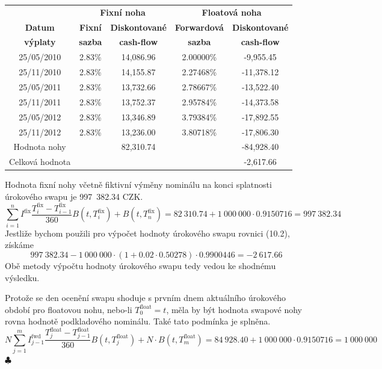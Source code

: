 \documentclass[a4paper]{book}
\begin{document}
\begin{center}
     \begin{tabular}{|c | c c | c c|}
     \cline{1-5}
      & \multicolumn{2}{c|}{\textbf{Fixní noha}} & \multicolumn{2}{c|}{\textbf{Floatová noha}} \\
     \textbf{Datum} &  \textbf{Fixní} & \textbf{Diskontované} & \textbf{Forwardová} & \textbf{Diskontované} \\
     \textbf{výplaty} &  \textbf{sazba} &\textbf{cash-flow} & \textbf{sazba} & \textbf{cash-flow} \\
     \hline
     25/05/2010   & 2.83\% & 14,086.96 & 2.00000\% &  -9,955.45 \\
     25/11/2010   & 2.83\% & 14,155.87 & 2.27468\% & -11,378.12 \\
     25/05/2011   & 2.83\% & 13,732.66 & 2.78667\% & -13,522.40 \\
     25/11/2011   & 2.83\% & 13,752.37 & 2.95784\% & -14,373.58 \\
     25/05/2012   & 2.83\% & 13,346.89 & 3.79384\% & -17,892.55 \\
     25/11/2012   & 2.83\% & 13,236.00 & 3.80718\% & -17,806.30 \\
     \hline
     Hodnota nohy &         & 82,310.74 &           & -84,928.40 \\
     \hline
     Celková hodnota &        \multicolumn{3}{c}{}       & -2,617.66 \\
     \cline{1-5}
     \end{tabular}
\end{center}
Hodnota fixní nohy včetně fiktivní výměny nominálu na konci splatnosti úrokového swapu je 997~382.34 CZK.
\begin{equation*}
\sum_{i=1}^n I^{\mathrm{fix}} \frac{T_i^{\mathrm{fix}}-T_{i-1}^{\mathrm{fix}}}{360}B(t,T_i^{\mathrm{fix}}) + B(t, T_n^{\mathrm{fix}}) = 82~310.74 + 1~000~000 \cdot 0.9150716 = 997~382.34
\end{equation*}
Jestliže bychom použili pro výpočet hodnoty úrokového swapu rovnici (10.2), získáme
\begin{equation*}
997~382.34 - 1~000~000 \cdot (1 + 0.02 \cdot 0.50278) \cdot 0.9900446 = -2~617.66
\end{equation*}
Obě metody výpočtu hodnoty úrokového swapu tedy vedou ke shodnému výsledku.

Protože se den ocenění swapu shoduje s prvním dnem aktuálního úrokového období pro floatovou nohu, nebo-li $T_0^{\mathrm{float}} = t$, měla by být hodnota swapové nohy rovna hodnotě podkladového nominálu. Také tato podmínka je splněna.
\begin{equation*}
N \sum_{j=1}^m I_{j-1}^{\mathrm{fwd}} \frac{T_j^{\mathrm{float}}-T_{j-1}^{\mathrm{float}}}{360}B(t,T_j^{\mathrm{float}}) +  N \cdot B(t,T_m^{\mathrm{float}}) = 84~928.40 + 1~000~000 \cdot 0.9150716 = 1~000~000
\end{equation*}
$\clubsuit$
\end{document}
